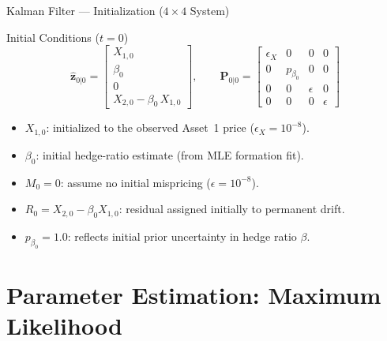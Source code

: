 \documentclass[10pt, aspectratio=169]{beamer}
\begin{document}
\begin{frame}{Kalman Filter --- Initialization ($4 \times 4$ System)}
  \begin{block}{Initial Conditions ($t = 0$)}
    \[
      \hat{\bm{z}}_{0|0} = \begin{bmatrix}X_{1,0}\\[2pt] \beta_0\\[2pt] 0\\[2pt] X_{2,0} - \beta_0\,X_{1,0}\end{bmatrix},\qquad
      \bm{P}_{0|0} = \begin{bmatrix}
        \epsilon_X & 0 & 0 & 0\\
        0 & p_{\beta_0} & 0 & 0\\
        0 & 0 & \epsilon & 0\\
        0 & 0 & 0 & \epsilon
      \end{bmatrix}
    \]
  \end{block}
  \vspace{4pt}
  \begin{itemize}
    \item $X_{1,0}$: initialized to the observed Asset~1 price ($\epsilon_X = 10^{-8}$).
    \item $\beta_0$: initial hedge-ratio estimate (from MLE formation fit).
    \item $M_0 = 0$: assume no initial mispricing ($\epsilon = 10^{-8}$).
    \item $R_0 = X_{2,0} - \beta_0 X_{1,0}$: residual assigned initially to permanent drift.
    \item $p_{\beta_0} = 1.0$: reflects initial prior uncertainty in hedge ratio $\beta$.
  \end{itemize}
\end{frame}

\section{Parameter Estimation: Maximum Likelihood}
\end{document}
